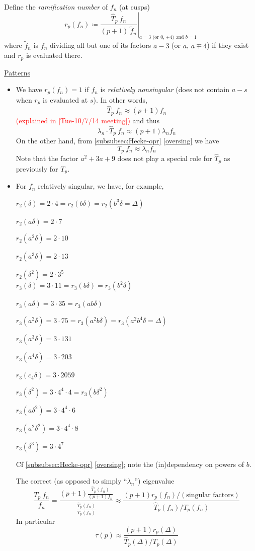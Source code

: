 \documentclass{rs}
\theoremstyle{definition}
\theoremstyle{remark}
\renewcommand{\D}{\Delta}
\renewcommand{\d}{\delta}
\renewcommand{\l}{\lambda}
\newcommand{\T}{\tau}
\newcommand{\ce}{\coloneqq}
\newcommand{\Ht}{\widehat{T}}
\renewcommand{\=}{\approx}
\renewcommand{\-}{\sim}
\newcommand{\rd}[1]{\textcolor{red}{#1}}
\numberwithin{equation}{section}
\numberwithin{thm}{section}
\begin{document}
Define the {\em ramification number} of $f_n$ (at cusps) 
\[
 r_p(f_n) \ce \left. \frac{\Ht_p ~ f_n}{(p + 1) ~ \widetilde{f}_n} \right|_\text{$a = 3$ (or 0, $\pm 4$) and $b = 1$} 
\]
where $\widetilde{f}_n$ is $f_n$ dividing all but one of its factors $a - 3$ (or $a$, $a \mp 4$) if they exist and $r_p$ is evaluated there.  

\underline{Patterns}
\begin{itemize}
 \item We have $r_p(f_n) = 1$ if $f_n$ is {\em relatively nonsingular} (does not contain $a - s$ when $r_p$ is evaluated at $s$).  In other words, 
 \[
  \Ht_p ~ f_n \= (p + 1) f_n 
 \]
 \rd{(explained in [Tue-10/7/14 meeting])} and thus 
 \[
  \l_n \cdot \Ht_p ~ f_n \= (p + 1) \l_n f_n 
 \]
 On the other hand, from \ref{subsubsec:Hecke-opr} \eqref{oversing} we have 
 \[
  T_p ~ f_n \= \l_n f_n 
 \]
 Note that the factor $a^2 + 3 a + 9$ does not play a special role for $\Ht_p$ as previously for $T_p$.  

 \item For $f_n$ relatively singular, we have, for example, 

 $r_2(\d) = 2 \cdot 4 = r_2(b \d) = r_2(b^3 \d = \D)$ 

 $r_2(a \d) = 2 \cdot 7$ 

 $r_2(a^2 \d) = 2 \cdot 10$ 

 $r_2(a^3 \d) = 2 \cdot 13$ 

 $r_2(\d^2) = 2 \cdot 3^5$ \\

 $r_3(\d) = 3 \cdot 11 = r_3(b \d) = r_3(b^2 \d)$ 

 $r_3(a \d) = 3 \cdot 35 = r_3(a b \d)$ 

 $r_3(a^2 \d) = 3 \cdot 75 = r_3(a^2 b \d) = r_3(a^2 b^4 \d = \D)$ 

 $r_3(a^3 \d) = 3 \cdot 131$ 

 $r_3(a^4 \d) = 3 \cdot 203$ 

 $r_3(c_4 \d) = 3 \cdot 2059$ 

 $r_3(\d^2) = 3 \cdot 4^4 \cdot 4 = r_3(b \d^2)$ 

 $r_3(a \d^2) = 3 \cdot 4^4 \cdot 6$ 

 $r_3(a^2 \d^2) = 3 \cdot 4^4 \cdot 8$ 

 $r_3(\d^3) = 3 \cdot 4^7$ 

 Cf \ref{subsubsec:Hecke-opr} \eqref{oversing}; note the (in)dependency on powers of $b$.  

 The correct (as opposed to simply ``$\l_n$'') eigenvalue 
 \[
  \frac{T_p ~ f_n}{f_n} = \frac{(p + 1) \frac{\Ht_p(f_n)}{(p + 1) f_n}}{\frac{\Ht_p(f_n)}{T_p(f_n)}} \= \frac{(p + 1) r_p(f_n) / (\text{singular factors})}{\Ht_p(f_n) / T_p(f_n)} 
 \]
 In particular 
 \[
  \T(p) \= \frac{(p + 1) r_p(\D)}{\Ht_p(\D) / T_p(\D)} 
 \]
\end{itemize}
\end{document}
